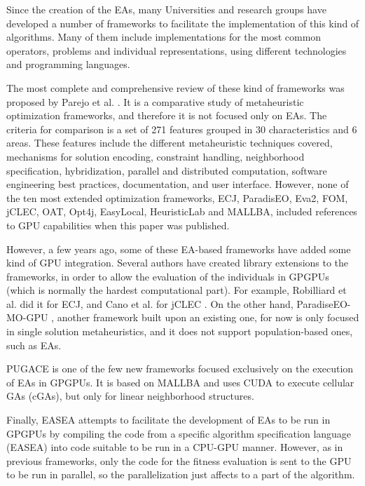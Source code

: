 \documentclass{article}
\begin{document}
Since the creation of the EAs, many Universities and research groups have developed a number of frameworks to facilitate the implementation of this kind of algorithms. Many of them include implementations for the most common operators, problems and individual representations, using different technologies and programming languages.

The most complete and comprehensive review of these kind of frameworks was proposed by Parejo et al. \cite{springerlink:10.1007/s00500-011-0754-8}. It is a comparative study of metaheuristic optimization frameworks, and therefore it is not focused only on EAs. The criteria for comparison is a set of 271 features grouped in 30 characteristics and 6 areas. These features include the different metaheuristic techniques covered, mechanisms for solution encoding, constraint handling, neighborhood specification, hybridization, parallel and distributed computation, software engineering best practices, documentation, and user interface. However, none of the ten most extended optimization frameworks, ECJ, ParadisEO, Eva2, FOM, jCLEC, OAT, Opt4j, EasyLocal, HeuristicLab and MALLBA, included references to GPU capabilities when this paper was published.

However, a few years ago, some of these EA-based frameworks have added some
kind of GPU integration. Several authors have created library
extensions to the frameworks, in order to allow the evaluation of the
individuals in GPGPUs (which is normally the hardest computational
part). For example, Robilliard et al. \cite{RobilliardECJGPU08} did it
for ECJ, and Cano et al. for jCLEC
\cite{SpeedingTheEvaluationofGPCano:2012}.
On the other hand, ParadiseEO-MO-GPU \cite{MealbParadiseoGPU13}, another framework built upon an existing one, for now is only focused in single solution metaheuristics, and it does not support population-based ones, such as EAs.


PUGACE \cite{5586286} is one of the few new frameworks focused exclusively on the execution of EAs in GPGPUs. It is based on MALLBA and uses CUDA to execute cellular GAs (cGAs), but only for linear neighborhood structures. %

Finally, EASEA \cite{Maitre:2009:CGP:1569901.1570089} attempts to facilitate the development of EAs to be run in GPGPUs by compiling the code from a specific algorithm specification language (EASEA) into code suitable to be run in a CPU-GPU manner.
However, as in previous frameworks, only the code for the fitness
evaluation is sent to the GPU to be run in parallel, so the parallelization just affects to a part of the algorithm.
\end{document}
